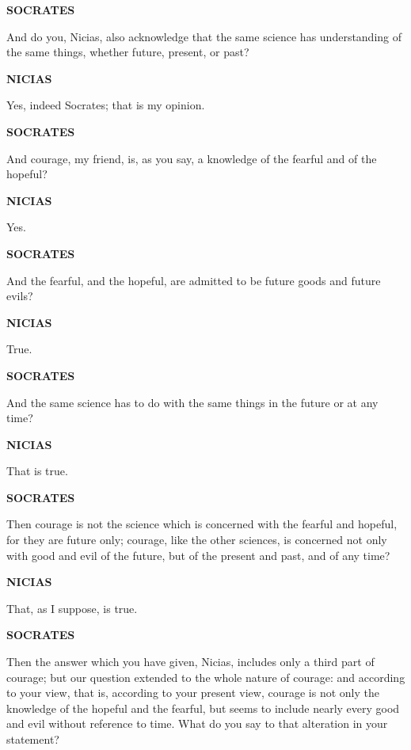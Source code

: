 \documentclass[11pt,letter]{book}
\begin{document}
\par \textbf{SOCRATES}
\par   And do you, Nicias, also acknowledge that the same science has understanding of the same things, whether future, present, or past?

\par \textbf{NICIAS}
\par   Yes, indeed Socrates; that is my opinion.

\par \textbf{SOCRATES}
\par   And courage, my friend, is, as you say, a knowledge of the fearful and of the hopeful?

\par \textbf{NICIAS}
\par   Yes.

\par \textbf{SOCRATES}
\par   And the fearful, and the hopeful, are admitted to be future goods and future evils?

\par \textbf{NICIAS}
\par   True.

\par \textbf{SOCRATES}
\par   And the same science has to do with the same things in the future or at any time?

\par \textbf{NICIAS}
\par   That is true.

\par \textbf{SOCRATES}
\par   Then courage is not the science which is concerned with the fearful and hopeful, for they are future only; courage, like the other sciences, is concerned not only with good and evil of the future, but of the present and past, and of any time?

\par \textbf{NICIAS}
\par   That, as I suppose, is true.

\par \textbf{SOCRATES}
\par   Then the answer which you have given, Nicias, includes only a third part of courage; but our question extended to the whole nature of courage:  and according to your view, that is, according to your present view, courage is not only the knowledge of the hopeful and the fearful, but seems to include nearly every good and evil without reference to time. What do you say to that alteration in your statement?
\end{document}
